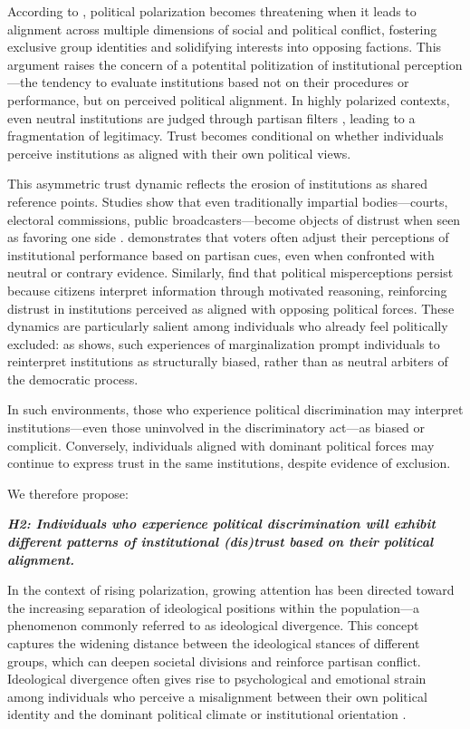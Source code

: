 \documentclass{article}
\begin{document}
According to \textcite{baldassarri_partisans_2008}, political polarization becomes threatening when it leads to alignment across multiple dimensions of social and political conflict, fostering exclusive group identities and solidifying interests into opposing factions. This argument raises the concern of a potentital politization of institutional perception—the tendency to evaluate institutions based not on their procedures or performance, but on perceived political alignment. In highly polarized contexts, even neutral institutions are judged through partisan filters \parencite{rogowski_how_2016, druckman_what_2019}, leading to a fragmentation of legitimacy. Trust becomes conditional on whether individuals perceive institutions as aligned with their own political views.

This asymmetric trust dynamic reflects the erosion of institutions as shared reference points. Studies show that even traditionally impartial bodies—courts, electoral commissions, public broadcasters—become objects of distrust when seen as favoring one side \parencite{keefer_trust_2022}. \textcite{lenz_follow_2012} demonstrates that voters often adjust their perceptions of institutional performance based on partisan cues, even when confronted with neutral or contrary evidence. Similarly, \textcite{nyhan_when_2010} find that political misperceptions persist because citizens interpret information through motivated reasoning, reinforcing distrust in institutions perceived as aligned with opposing political forces. These dynamics are particularly salient among individuals who already feel politically excluded: as \textcite{oskooii_perceived_2020} shows, such experiences of marginalization prompt individuals to reinterpret institutions as structurally biased, rather than as neutral arbiters of the democratic process. 

In such environments, those who experience political discrimination may interpret institutions—even those uninvolved in the discriminatory act—as biased or complicit. Conversely, individuals aligned with dominant political forces may continue to express trust in the same institutions, despite evidence of exclusion.

We therefore propose:

\emph{\textbf{\small
H2: Individuals who experience political discrimination will exhibit different patterns of institutional (dis)trust based on their political alignment.
}}

In the context of rising polarization, growing attention has been directed toward the increasing separation of ideological positions within the population—a phenomenon commonly referred to as ideological divergence. This concept captures the widening distance between the ideological stances of different groups, which can deepen societal divisions and reinforce partisan conflict. Ideological divergence often gives rise to psychological and emotional strain among individuals who perceive a misalignment between their own political identity and the dominant political climate or institutional orientation \parencite{lelkes_limits_2017, federico_ideological_2012}.
\end{document}
